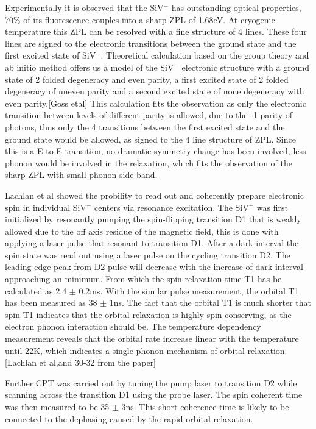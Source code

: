 Experimentally it is observed that the SiV$^{-}$ has outstanding optical properties, 70$\%$ of its fluorescence couples into a sharp ZPL of 1.68eV. At cryogenic temperature this ZPL can be resolved with a fine structure of 4 lines. These four lines are signed to the electronic transitions between the ground state and the first excited state of SiV$^{-}$. Theoretical calculation based on the group theory and ab initio method offers us a model of the SiV$^{-}$ electronic structure with a ground state of 2 folded degeneracy and even parity, a first excited state of 2 folded degeneracy of uneven parity and a second excited state of none degeneracy with even parity.[Goss etal] This calculation fits the observation as only the electronic transition between levels of different parity is allowed, due to the -1 parity of photons, thus only the 4 transitions between the first excited state and the ground state would be allowed, as signed to the 4 line structure of ZPL. Since this is a E to E transition, no dramatic symmetry change has been involved, less phonon would be involved in the relaxation, which fits the observation of the sharp ZPL with small phonon side band. 

Lachlan et al showed the probility to read out and coherently prepare electronic spin in individual SiV$^{-}$ centers via resonance excitation. The SiV$^{-}$ was first initialized by resonantly pumping the spin-flipping transition D1 that is weakly allowed due to the off axis residue of the magnetic field, this is done with applying a laser pulse that resonant to transition D1. After a dark interval the spin state was read out using a laser pulse on the cycling transition D2. The leading edge peak from D2 pulse will decrease with the increase of dark interval approaching an minimum. From which the spin relaxation time T1 has be calculated as 2.4 $\pm$ 0.2ms. With the similar pulse measurement, the orbital T1 has been measured as 38 $\pm$ 1ns. The fact that the orbital T1 is much shorter that spin T1 indicates that the orbital relaxation is highly spin conserving, as the electron phonon interaction should be.  The temperature dependency measurement reveals that the orbital rate increase linear with the temperature until 22K, which indicates a single-phonon mechanism of orbital relaxation.[Lachlan et al,and 30-32 from the paper]

Further CPT was carried out by tuning the pump laser to transition D2 while scanning across the transition D1 using the probe laser. The spin coherent time was then measured to be 35 $\pm$ 3ns. This short coherence time is likely to be connected to the dephasing caused by the rapid orbital relaxation.

